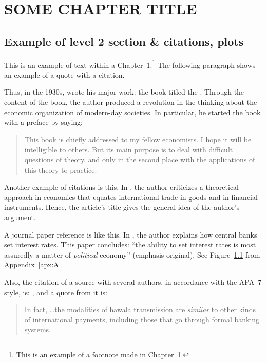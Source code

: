 %
%
%
%

\newpage
\section{\MakeUppercase{Some Chapter Title}}\label{sec:ch1}

\subsection{Example of level 2 section \& citations, plots}

This is an example of text within a Chapter~\ref{sec:ch1}.\footnote{This is an example of a footnote made in Chapter~\ref{sec:ch1}.} The following paragraph shows an example of a quote with a citation.

Thus, in the 1930s, \citeauthor{book1} wrote his major work: the book titled the . Through the content of the book, the author produced a revolution in the thinking about the economic organization of modern-day societies. In particular, he started the book with a preface by saying:

\begin{quote}
    This book is chiefly addressed to my fellow economists. I hope it will be intelligible to others. But its main purpose is to deal with difficult questions of theory, and only in the second place with the applications of this theory to practice.~\parencite[p.~v]{book1}
\end{quote}

Another example of citations is this. In \textcite{article1}, the author criticizes a theoretical approach in economics that equates international trade in goods and in financial instruments. Hence, the article's title  gives the general idea of the author's argument.

A journal paper reference is like this. In \textcite{article2}, the author explains how central banks set interest rates. This paper concludes: ``the ability to set interest rates is most assuredly a matter of \textit{political} economy'' (emphasis original). See Figure~\ref{} from Appendix~\ref{apx:A}.

Also, the citation of a source with several authors, in accordance with the APA~7 style, is: \textcite{wp1}, and a quote from it is: 

\begin{quote}
    In fact, \dots the modalities of hawala transmission are \textit{similar} to other kinds of international payments, including those that go through formal banking systems. \parencite[p.~14, emphasis added]{wp1}
\end{quote}

